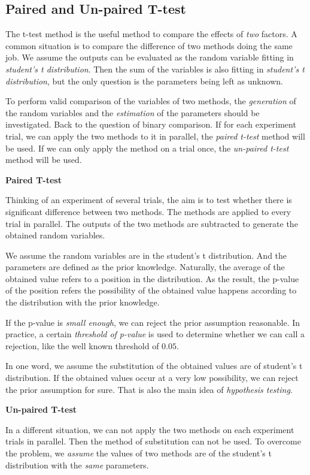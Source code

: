 \subsection{Paired and Un-paired T-test}

The t-test method is the useful method to compare the effects of \emph{two} factors.
A common situation is to compare the difference of two methods doing the same job.
We assume the outputs can be evaluated as the random variable fitting in \emph{student's t distribution}.
Then the sum of the variables is also fitting in \emph{student's t distribution},
but the only question is the parameters being left as unknown.

To perform valid comparison of the variables of two methods,
the \emph{generation} of the random variables and the \emph{estimation} of the parameters should be investigated.
Back to the question of binary comparison.
If for each experiment trial, we can apply the two methods to it in parallel, the \emph{paired t-test} method will be used.
If we can only apply the method on a trial once, the \emph{un-paired t-test} method will be used.

\textbf{Paired T-test}

Thinking of an experiment of several trials, the aim is to test whether there is significant difference between two methods.
The methods are applied to every trial in parallel.
The outputs of the two methods are subtracted to generate the obtained random variables.

We assume the random variables are in the student's t distribution.
And the parameters are defined as the prior knowledge.
Naturally, the average of the obtained value refers to a position in the distribution.
As the result, the p-value of the position refers the possibility of the obtained value happens according to the distribution with the prior knowledge.

If the p-value is \emph{small enough}, we can reject the prior assumption reasonable.
In practice, a certain \emph{threshold of p-value} is used to determine whether we can call a rejection, like the well known threshold of $0.05$.

In one word, we assume the substitution of the obtained values are of student's t distribution.
If the obtained values occur at a very low possibility, we can reject the prior assumption for sure.
That is also the main idea of \emph{hypothesis testing}.

\textbf{Un-paired T-test}

In a different situation, we can not apply the two methods on each experiment trials in parallel.
Then the method of substitution can not be used.
To overcome the problem,
we \emph{assume} the values of two methods are of the student's t distribution with the \emph{same} parameters.

